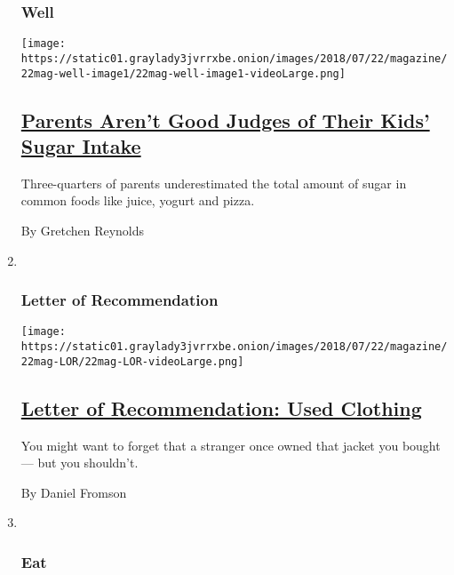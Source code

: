 \begin{enumerate}
{  \subsubsection{Well}\label{well}}

  \texttt{[image: https://static01.graylady3jvrrxbe.onion/images/2018/07/22/magazine/22mag-well-image1/22mag-well-image1-videoLarge.png]}

  \hypertarget{parents-arent-good-judges-of-their-kids-sugar-intake}{%
  \subsection{\texorpdfstring{\href{/2018/07/19/well/parents-kids-sugar-food.html}{Parents
  Aren't Good Judges of Their Kids' Sugar
  Intake}}{Parents Aren't Good Judges of Their Kids' Sugar Intake}}\label{parents-arent-good-judges-of-their-kids-sugar-intake}}

  Three-quarters of parents underestimated the total amount of sugar in
  common foods like juice, yogurt and pizza.

  By Gretchen Reynolds
\item ~
  \hypertarget{letter-of-recommendation}{%
  \subsubsection{Letter of
  Recommendation}\label{letter-of-recommendation}}

  \texttt{[image: https://static01.graylady3jvrrxbe.onion/images/2018/07/22/magazine/22mag-LOR/22mag-LOR-videoLarge.png]}

  \hypertarget{letter-of-recommendation-used-clothing}{%
  \subsection{\texorpdfstring{\href{/2018/07/18/magazine/letter-of-recommendation-used-clothing.html}{Letter
  of Recommendation: Used
  Clothing}}{Letter of Recommendation: Used Clothing}}\label{letter-of-recommendation-used-clothing}}

  You might want to forget that a stranger once owned that jacket you
  bought --- but you shouldn't.

  By Daniel Fromson
\item ~
  \hypertarget{eat}{%
  \subsubsection{Eat}\label{eat}}


\end{enumerate}
